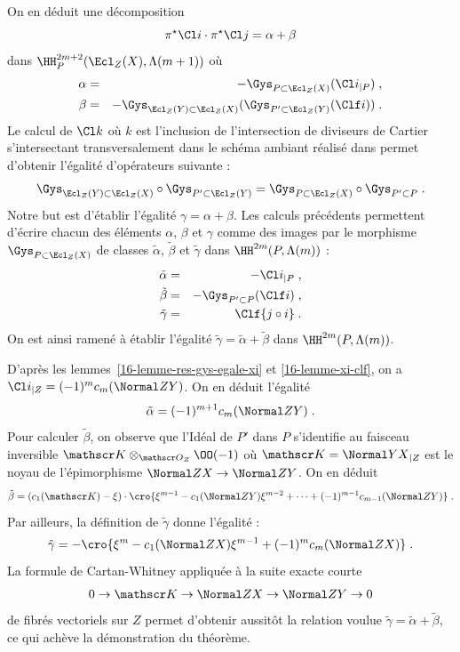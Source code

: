 \documentclass[10pt]{../fichiers-configuration-latex/smfart}
\begin{document}
On en déduit une décomposition
\[\pi^\star\Cl i\cdot\pi^\star \Cl j=\alpha+\beta\] dans
$\HH^{2m+2}_P(\Ecl_Z(X),\Lambda(m+1))$ où
\begin{eqnarray*}
\alpha &=&-\Gys_{P\subset \Ecl_Z(X)}({\Cl i}_{|P})\;\text{,} \\
\beta &=& -\Gys_{\Ecl_Z(Y)\subset \Ecl_Z(X)}(\Gys_{P'\subset \Ecl_Z(Y)}(\Clf i))\;\text{.}
\end{eqnarray*}
Le calcul de $\Cl k$ où $k$ est l'inclusion de l'intersection de diviseurs
de Cartier s'intersectant transversalement dans le schéma ambiant réalisé dans 
\cite[proposition~1.1.4]{AZUMINO@Fujiwara}
permet d'obtenir l'égalité d'opérateurs suivante :
\[\Gys_{\Ecl_Z(Y)\subset \Ecl_Z(X)}\circ \Gys_{P'\subset \Ecl_Z(Y)} = 
\Gys_{P\subset \Ecl_Z(X)}\circ \Gys_{P'\subset P}\;\text{.}\]
Notre but est d'établir l'égalité $\gamma=\alpha+\beta$. Les calculs
précédents permettent d'écrire chacun des éléments $\alpha$, $\beta$ et
$\gamma$ comme des images par le morphisme $\Gys_{P\subset \Ecl_Z(X)}$
de classes
$\tilde{\alpha}$, $\tilde{\beta}$ et $\tilde{\gamma}$ dans
$\HH^{2m}(P,\Lambda(m))$ :
\begin{eqnarray*}
\tilde{\alpha} &=& -{\Cl i}_{|P}\;\text{,}\\
\tilde{\beta} &=& -\Gys_{P'\subset P}(\Clf i)\;\text{,}\\
\tilde{\gamma} &=& \Clf {j\circ i}\;\text{.}
\end{eqnarray*}
On est ainsi ramené à établir l'égalité
$\tilde{\gamma}=\tilde{\alpha}+\tilde{\beta}$
dans $\HH^{2m}(P,\Lambda(m))$.

D'après les lemmes~\ref{16-lemme-res-gys-egale-xi} et \ref{16-lemme-xi-clf}, on a 
${\Cl i}_{|Z}=(-1)^{m}c_m(\Normal Z Y)$. On en déduit l'égalité
\[\tilde{\alpha}=(-1)^{m+1}c_m(\Normal Z Y)\;\text{.}\]
Pour calculer $\tilde{\beta}$, on observe que l'Idéal de $P'$ dans $P$
s'identifie au faisceau inversible $\mathscr K
\otimes_{{\mathscr O}_Z} \OO(-1)$
où $\mathscr K={\Normal Y X}_{|Z}$ est le noyau de l'épimorphisme
$\Normal Z X\to \Normal Z Y$. On en déduit 
\[\tilde{\beta}= (c_1(\mathscr K)-\xi)\cdot\cro{\xi^{m-1}-c_1(\Normal Z
Y)\xi^{m-2}+\dots + (-1)^{m-1}c_{m-1}(\Normal Z Y)}\;\text{.}\]
Par ailleurs, la définition de $\tilde{\gamma}$ donne l'égalité :
\[\tilde{\gamma} = -\cro{\xi^m-c_1(\Normal Z X)\xi^{m-1}+(-1)^mc_m(\Normal
Z X)}\;\text{.}\]
La formule de Cartan-Whitney appliquée à la suite exacte courte
\[0\to \mathscr K\to \Normal Z X\to\Normal Z Y\to 0\]
de fibrés vectoriels sur $Z$ permet d'obtenir aussitôt la relation voulue
$\tilde{\gamma}=\tilde{\alpha}+\tilde{\beta}$, ce qui achève la
démonstration du théorème.
\end{document}
